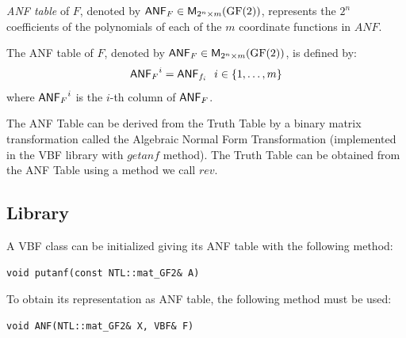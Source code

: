 \begin{definition}
\textit{ANF table} of $F$, denoted by $\matr{ANF}_F \in \matr{M}_{2^n \times m}(\gf{GF(2)})$, represents the $2^n$ coefficients of the polynomials of each of the $m$ coordinate functions in $ANF$.

The ANF table of $F$, denoted by $\matr{ANF}_F \in \matr{M}_{2^n \times m}(\gf{GF(2)})$, is defined by:
\begin{equation}
    {\matr{ANF}_F}^i= \matr{ANF}_{f_i} \  \  i \in \{1,\dots,m\} 
\end{equation}
where ${\matr{ANF}_F}^i$ is the $i$-th column of $\matr{ANF}_F$.
\end{definition}

The ANF Table can be derived from the Truth Table by a binary matrix transformation called the Algebraic Normal Form Transformation (implemented in the VBF library with $getanf$ method). The Truth Table can be obtained from the ANF Table using a method we call $rev$.

\subsection{Library}

A VBF class can be initialized giving its ANF table with the following method:

\begin{verbatim}
void putanf(const NTL::mat_GF2& A)
\end{verbatim}

To obtain its representation as ANF table, the following method must be used:

\begin{verbatim}
void ANF(NTL::mat_GF2& X, VBF& F)
\end{verbatim}

